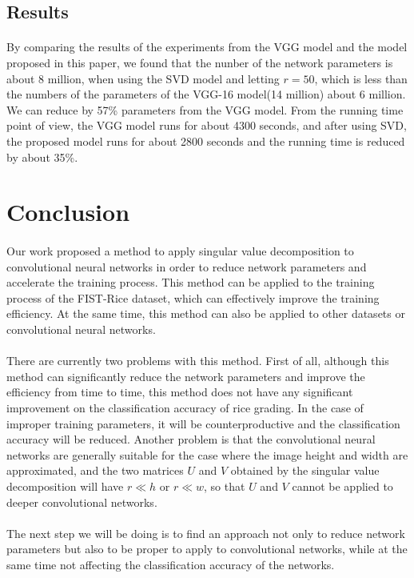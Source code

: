 \documentclass[12pt,a4paper]{article}
\begin{document}
\subsection{Results}
\paragraph{} By comparing the results of the experiments from the VGG model and the model proposed in this paper, we found that the nunber of the network parameters is about 8 million, when using the SVD model and letting $r=50$, which is less than the numbers of the parameters of the VGG-16 model(14 million) about 6 million. We can reduce by 57\% parameters from the VGG model. From the running time point of view, the VGG model runs for about 4300 seconds, and after using SVD, the proposed model runs for about 2800 seconds and the running time is reduced by about 35\%.

\section{Conclusion}
\paragraph{} Our work proposed a method to apply singular value decomposition to convolutional neural networks in order to reduce network parameters and accelerate the training process. This method can be applied to the training process of the FIST-Rice dataset, which can effectively improve the training efficiency. At the same time, this method can also be applied to other datasets or convolutional neural networks.

\paragraph{} There are currently two problems with this method. First of all, although this method can significantly reduce the network parameters and improve the efficiency from time to time, this method does not have any significant improvement on the classification accuracy of rice grading. In the case of improper training parameters, it will be counterproductive and the classification accuracy will be reduced. Another problem is that the convolutional neural networks are generally suitable for the case where the image height and width are approximated, and the two matrices $U$ and $V$ obtained by the singular value decomposition will have $r \ll h$ or $r \ll w$, so that $U$ and $V$ cannot be applied to deeper convolutional networks.
\paragraph{} The next step we will be doing is to find an approach not only to reduce network parameters but also to be proper to apply to convolutional networks, while at the same time not affecting the classification accuracy of the networks.







\end{document}
